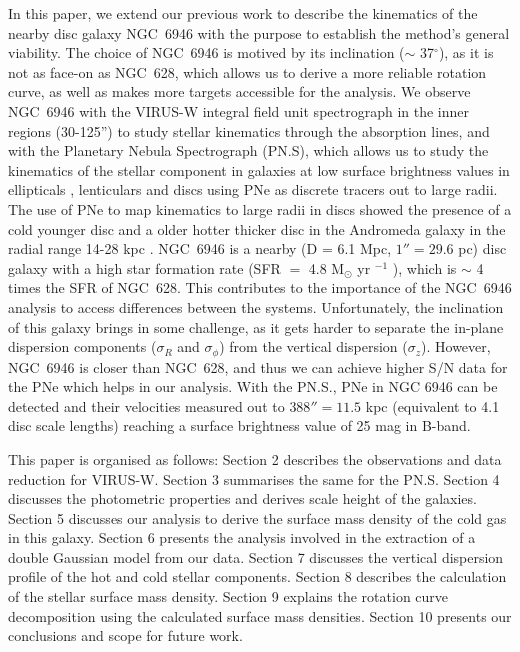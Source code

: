 \documentclass[fleqn,usenatbib]{mnras}
\begin{document}
 In this paper, we extend our previous work to describe the kinematics of the nearby disc galaxy NGC~6946 with the purpose to establish the method's general viability. The choice of NGC~6946 is motived by its inclination ($\sim$ 37$^\circ$), as it is not as face-on as NGC~628, which allows us to derive a more reliable rotation curve, as well as makes more targets accessible for the analysis. We observe NGC~6946 with the VIRUS-W integral field unit spectrograph in the inner regions (30-125'') to study stellar kinematics through the absorption lines, and with the Planetary Nebula Spectrograph (PN.S), which allows us to study the kinematics of the stellar component in galaxies at low surface brightness values in ellipticals \citep{pulsoni18}, lenticulars \citep{cortesi13} and discs  using PNe as discrete tracers out to large radii. The use of PNe to map kinematics to large radii in discs showed the presence of a cold younger disc and a older hotter thicker disc in the Andromeda galaxy in the radial range 14-28 kpc  \citep{Bhattacharya:19}. NGC~6946 is a nearby (D = 6.1 Mpc, $1'' = 29.6$ pc) disc galaxy with a high star formation rate (SFR $=$ 4.8 M$_\odot$ yr $^{-1}$ \citealp{Lee:06}), which is $\sim$ 4 times the SFR of NGC~628. This contributes to the importance of the NGC~6946 analysis to access differences between the systems. Unfortunately, the inclination of this galaxy brings in some challenge, as it gets harder to separate the in-plane dispersion components ($\sigma_R$ and $\sigma_\phi$) from the vertical dispersion ($\sigma_z$). However, NGC~6946 is closer than NGC~628, and thus we can achieve higher S/N data for the PNe which helps in our analysis. With the PN.S., PNe in NGC 6946 can be detected and their velocities measured out to $388'' = 11.5$ kpc (equivalent to 4.1 disc scale lengths) reaching a surface brightness value of 25 mag in B-band. 

This paper is organised as follows: Section 2 describes the observations and data reduction for VIRUS-W. Section 3 summarises the same for the PN.S. Section 4 discusses the photometric properties and derives scale height of the galaxies. Section 5 discusses our analysis to derive the surface mass density of the cold gas in this galaxy. Section 6 presents the analysis involved in the extraction of a double Gaussian model from our data. Section 7 discusses the vertical dispersion profile of the hot and cold stellar components. Section 8 describes the calculation of the stellar surface mass density. Section 9 explains the rotation curve decomposition using the calculated surface mass densities. Section 10 presents our conclusions and scope for future work.
\end{document}
